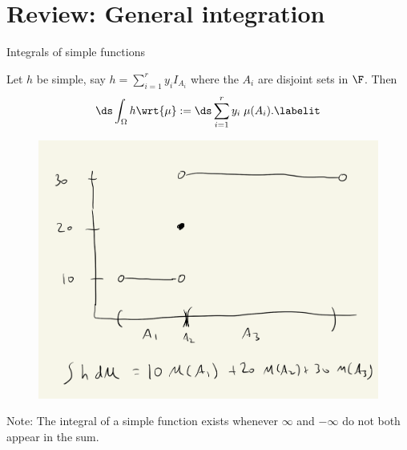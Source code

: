 \documentclass[10pt]{beamer}
\begin{document}
\section{Review: General integration}
\begin{frame}{Integrals of simple functions}

\begin{definition}
Let $h$ be simple, say $h = \sum_{i=1}^r y_i I_{A_i}$ where the $A_i$ are disjoint sets in $\F$.  Then
\begin{align*}
\ds\int_{\Omega} h \wrt{\mu} := \ds\sum_{i=1}^r y_i \; \mu(A_i).
\labelit \label{eqn:integral_of_simple_function}	
\end{align*}
 \label{def:integral_of_simple_function}
\end{definition}

\begin{figure}[H]
\centering 
\includegraphics[width=.4\textwidth]{images/integral_of_simple_function}	
\end{figure}	

{\tiny Note: The integral of a simple function exists whenever $\infty$ and  $-\infty$ do not both appear in the sum. } \\
\end{frame}
\end{document}
